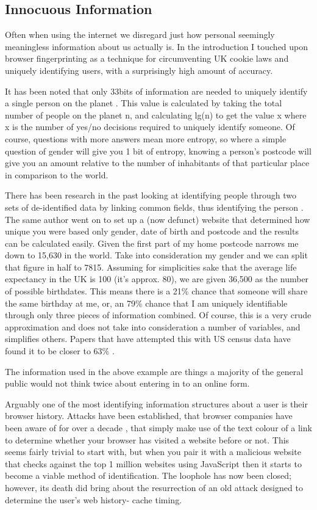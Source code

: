 \subsection{Innocuous Information}
Often when using the internet we disregard just how personal seemingly meaningless information about us actually is. In the introduction I touched upon browser fingerprinting as a technique for circumventing UK cookie laws and uniquely identifying users, with a surprisingly high amount of accuracy. 

It has been noted that only 33bits of information are needed to uniquely identify a single person on the planet \cite{research:33bits}. This value is calculated by taking the total number of people on the planet n, and calculating lg(n) to get the value x where x is the number of yes/no decisions required to uniquely identify someone. Of course, questions with more answers mean more entropy, so where a simple question of gender will give you 1 bit of entropy, knowing a person’s postcode will  give you an amount relative to the number of inhabitants of that particular place in comparison to the world.

There has been research in the past looking at identifying people through two sets of de-identified data by linking common fields, thus identifying the person \cite{research:lsweent}. The same author went on to set up a (now defunct) website that determined how unique you were based only gender, date of birth and postcode \cite{research:dpl} and the results can be calculated easily. Given the first part of my home postcode narrows me down to 15,630 in the world. Take into consideration my gender and we can split that figure in half to 7815. Assuming for simplicities sake that the average life expectancy in the UK is 100 (it’s approx. 80), we are given 36,500 as the number of possible birthdates. This means there is a 21\% chance that someone will share the same birthday at me, or, an 79\% chance that I am uniquely identifiable through only three pieces of information combined. Of course, this is a very crude approximation and does not take into consideration a number of variables, and simplifies others. Papers that have attempted this with US census data have found it to be closer to 63\% \cite{Golle:2006:RUS:1179601.1179615}.

The information used in the above example are things a majority of the general public would not think twice about entering in to an online form.

Arguably one of the most identifying information structures about a user is their browser history. Attacks have been established, that browser companies have been aware of for over a decade \cite{research:mozzy}, that simply make use of the text colour of a link to determine whether your browser has visited a website before or not. This seems fairly trivial to start with, but when you pair it with a malicious website that checks against the top 1 million websites using JavaScript then it starts to become a viable method of identification. The loophole has now been closed; however, its death did bring about the resurrection of an old attack designed to determine the user's web history- cache timing. 
